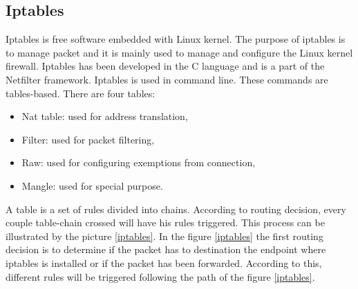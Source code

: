 \documentclass{tnreport}
\begin{document}
\subsection{Iptables}
Iptables is free software embedded with Linux kernel. The purpose of iptables is to manage packet and it is mainly used to manage and configure the Linux kernel firewall. Iptables has been developed in the C language and is a part of the Netfilter framework. Iptables is used in command line. These commands are tables-based. There are four tables: 
\begin{itemize}
    \item Nat table: used for address translation,
    \item Filter: used for packet filtering,
    \item Raw: used for configuring exemptions from connection,
    \item Mangle: used for special purpose.
\end{itemize}
A table is a set of rules divided into chains. According to routing decision, every couple table-chain crossed will have his rules triggered. This process can be illustrated by the picture \ref{iptables}. In the figure \ref{iptables} the first routing decision is to determine if the packet has to destination the endpoint where iptables is installed or if the packet has been forwarded. According to this, different rules will be triggered following the path of the figure \ref{iptables}.
\end{document}
